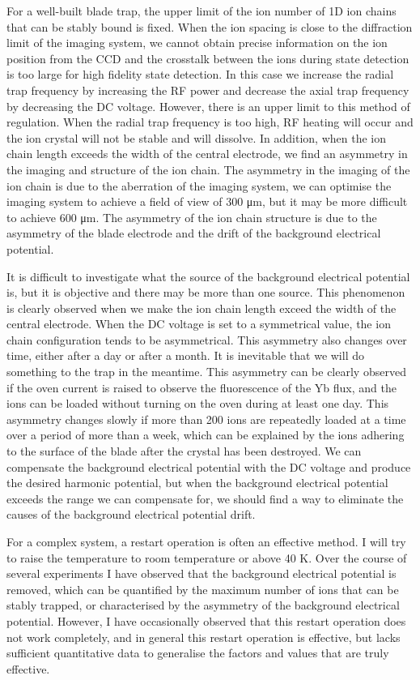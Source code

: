 For a well-built blade trap, the upper limit of the ion number of 1D ion chains that can be stably bound is fixed. When the ion spacing is close to the diffraction limit of the imaging system, we cannot obtain precise information on the ion position from the CCD and the crosstalk between the ions during state detection is too large for high fidelity state detection. In this case we increase the radial trap frequency by increasing the RF power and decrease the axial trap frequency by decreasing the DC voltage. However, there is an upper limit to this method of regulation. When the radial trap frequency is too high, RF heating will occur and the ion crystal will not be stable and will dissolve. In addition, when the ion chain length exceeds the width of the central electrode, we find an asymmetry in the imaging and structure of the ion chain. The asymmetry in the imaging of the ion chain is due to the aberration of the imaging system, we can optimise the imaging system to achieve a field of view of 300 μm, but it may be more difficult to achieve 600 μm. The asymmetry of the ion chain structure is due to the asymmetry of the blade electrode and the drift of the background electrical potential.

It is difficult to investigate what the source of the background electrical potential is, but it is objective and there may be more than one source. This phenomenon is clearly observed when we make the ion chain length exceed the width of the central electrode. When the DC voltage is set to a symmetrical value, the ion chain configuration tends to be asymmetrical. This asymmetry also changes over time, either after a day or after a month. It is inevitable that we will do something to the trap in the meantime. This asymmetry can be clearly observed if the oven current is raised to observe the fluorescence of the Yb flux, and the ions can be loaded without turning on the oven during at least one day. This asymmetry changes slowly if more than 200 ions are repeatedly loaded at a time over a period of more than a week, which can be explained by the ions adhering to the surface of the blade after the crystal has been destroyed. We can compensate the background electrical potential with the DC voltage and produce the desired harmonic potential, but when the background electrical potential exceeds the range we can compensate for, we should find a way to eliminate the causes of the background electrical potential drift.

For a complex system, a restart operation is often an effective method. I will try to raise the temperature to room temperature or above 40 K. Over the course of several experiments I have observed that the background electrical potential is removed, which can be quantified by the maximum number of ions that can be stably trapped, or characterised by the asymmetry of the background electrical potential. However, I have occasionally observed that this restart operation does not work completely, and in general this restart operation is effective, but lacks sufficient quantitative data to generalise the factors and values that are truly effective.

